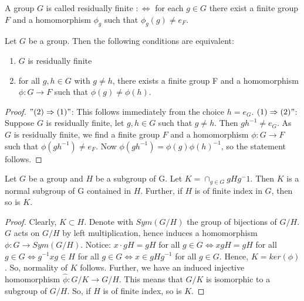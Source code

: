 \begin{definition}
A group $G$ is called residually finite $: \Leftrightarrow$ for each $g \in G$ there exist a finite group $F$ and a homomorphism $\phi _g$ such that $\phi_g (g) \neq e_F$.
\end{definition}

\begin{proposition}
Let $G$ be a group. Then the following conditions are equivalent:
\begin{enumerate}
\item $G$ is residually finite
\item for all $g, h \in G$ with $g \neq h$, there exists a finite group F and a homomorphism $\phi: G \rightarrow F$ such that $\phi(g) \neq \phi(h)$.
\end{enumerate}

\end{proposition}

\begin{proof}
$"(2) \Rightarrow (1)"$: This follows immediately from the choice $h = e_G$. \newline
$(1) \Rightarrow (2)"$: Suppose $G$ is residually finite, let $g, h \in G$ such that $g \neq h$.
Then $gh^{-1} \neq e_G$. As $G$ is residually finite, we find a finite group $F$ and a homomorphism $\phi: G \rightarrow F$ such that $\phi(gh^{-1}) \neq e_F$. Now $\phi(gh^{-1} ) = \phi(g) \phi(h)^{-1}$, so the statement follows.
\end{proof}

\begin{lemma}
Let $G$ be a group and $H$ be a subgroup of G. Let $K = \cap_{g \in G}
gHg^-1$. Then $K$ is a normal subgroup of G contained in $H$. Further, if $H$ is of finite index in $G$, then so is $K$.
\end{lemma}

\begin{proof}
Clearly, $K \subset H$. Denote with $Sym(G/H)$ the group of bijections of $G/H$. $G$ acts on $G/H$ by left multiplication, hence induces a homomorphism $\phi: G \rightarrow Sym(G/H)$.
Notice: $x \cdot gH = gH$ for all $g \in G\Leftrightarrow xgH = gH$ for all $g \in G \Leftrightarrow g^{-1}xg \in H$ for all $g \in G \Leftrightarrow x \in gHg^{-1}$ for all $g\in G$. Hence, $K = ker(\phi)$. So, normality of $K$ follows. \newline Further, we have an induced injective homomorphism $\hat{\phi}: G/K \rightarrow G/H$.  This means that $G/K$ is isomorphic to a subgroup of $G/H$. So, if $H$ is of finite index, so is $K$.
\end{proof}


